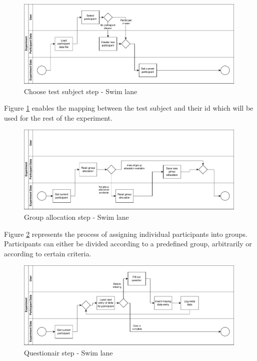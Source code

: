 \begin{figure}[htbp]
    \centering
    \includegraphics[width=0.99\textwidth, keepaspectratio]{content/05_design_and_dev_artefacts/ChooseTestSubjectSwimLane.drawio.pdf}
    \caption{Choose test subject step - Swim lane}    
    \label{fig:ChooseTestSubjectSwimLane}
\end{figure}

Figure \ref{fig:ChooseTestSubjectSwimLane} enables the mapping between the test subject and their \ac{id} which will be used for the rest of the experiment.

\begin{figure}[htbp]
    \centering
    \includegraphics[width=0.99\textwidth, keepaspectratio]{content/05_design_and_dev_artefacts/GroupAllocationSwimLane.drawio.pdf}
    \caption{Group allocation step - Swim lane}    
    \label{fig:groupAllocationSwimLane}
\end{figure}

Figure \ref{fig:groupAllocationSwimLane} represents the process of assigning individual participants into groups. Participants can either be divided according to a predefined group, arbitrarily or according to certain criteria.

\begin{figure}[htbp]
    \centering
    \includegraphics[width=0.99\textwidth, keepaspectratio]{content/05_design_and_dev_artefacts/QuestionairSwimLane.drawio.pdf}
    \caption{Questionair step - Swim lane}    
    \label{fig:questionairSwimLane}
\end{figure}

